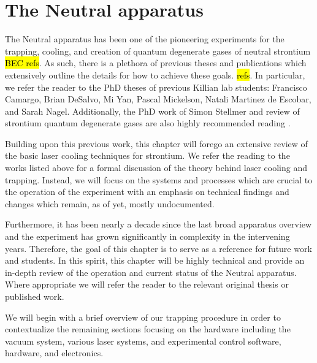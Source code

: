 \chapter{The Neutral apparatus}
\label{ch:chap2}

The Neutral apparatus has been one of the pioneering experiments for the trapping, cooling, and creation of quantum degenerate gases of neutral strontium \hl{BEC refs}. 
As such, there is a plethora of previous theses and publications which extensively outline the details for how to achieve these goals. \hl{refs}. 
In particular, we refer the reader to the PhD theses of previous Killian lab students: Francisco Camargo, Brian DeSalvo, Mi Yan, Pascal Mickelson, Natali Martinez de Escobar, and Sarah Nagel. 
Additionally, the PhD work of Simon Stellmer \cite{SimonStellmer2013} and review of strontium quantum degenerate gases are also highly recommended reading \cite{StellmerRev2013}.

Building upon this previous work, this chapter will forego an extensive review of the basic laser cooling techniques for strontium. 
We refer the reading to the works listed above for a formal discussion of the theory behind laser cooling and trapping.
Instead, we will focus on the systems and processes which are crucial to the operation of the experiment with an emphasis on technical findings and changes which remain, as of yet, mostly undocumented.

Furthermore, it has been nearly a decade since the last broad apparatus overview \cite{MartinezdeEscolar2010} and the experiment has grown significantly in complexity in the intervening years.
Therefore, the goal of this chapter is to serve as a reference for future work and students. 
In this spirit, this chapter will be highly technical and provide an in-depth review of the operation and current status of the Neutral apparatus.
Where appropriate we will refer the reader to the relevant original thesis or published work.

We will begin with a brief overview of our trapping procedure in order to contextualize the remaining sections focusing on the hardware including the vacuum system, various laser systems, and experimental control software, hardware, and electronics.


